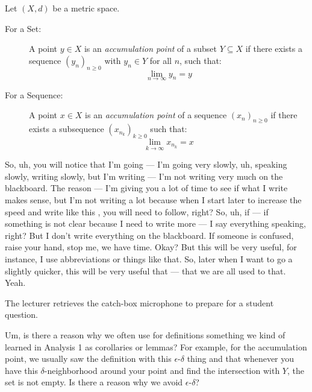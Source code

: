 \begin{math-stroke}
\begin{definition}\label{def:accumulation-point}
Let $(X, d)$ be a metric space.
\begin{description}
    \item[For a Set:] A point $y \in X$ is an \emph{accumulation point} of a subset $Y \subseteq X$ if there exists a sequence $(y_n)_{n \ge 0}$ with $y_n \in Y$ for all $n$, such that:
    \[ \lim_{n \to \infty} y_n = y \]
    \item[For a Sequence:] A point $x \in X$ is an \emph{accumulation point} of a sequence $(x_n)_{n \ge 0}$ if there exists a subsequence $(x_{n_k})_{k \ge 0}$ such that:
    \[ \lim_{k \to \infty} x_{n_k} = x \]
\end{description}
\end{definition}
\end{math-stroke}

\begin{spoken-clean}[00:00:36 - 00:01:43]
So, uh, you will notice that I'm going — I'm going very slowly, uh, speaking slowly, writing slowly, but I'm writing — I'm not writing very much on the blackboard. The reason — I'm giving you a lot of time to see if what I write makes sense, but I'm not writing a lot because when I start later to increase the speed and write like this , you will need to follow, right? So, uh, if — if something is not clear because I need to write more — I say everything speaking, right? But I don't write everything on the blackboard. If someone is confused, raise your hand, stop me, we have time. Okay? But this will be very useful, for instance, I use abbreviations or things like that. So, later when I want to go a slightly quicker, this will be very useful that — that we are all used to that. Yeah.
\end{spoken-clean}

\begin{meta-note}
The lecturer retrieves the catch-box microphone to prepare for a student question.
\end{meta-note}

\begin{student-interaction}
Um, is there a reason why we often use for definitions something we kind of learned in Analysis 1 as corollaries or lemmas? For example, for the accumulation point, we usually saw the definition with this $\epsilon$-$\delta$ thing and that whenever you have this $\delta$-neighborhood around your point and find the intersection with $Y$, the set is not empty. Is there a reason why we avoid $\epsilon$-$\delta$?
\end{student-interaction}

